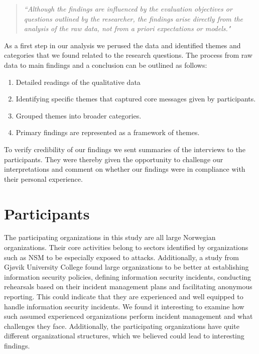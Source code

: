 \begin{quote}
\textit{``Although the findings are influenced by the evaluation objectives or
questions outlined by the researcher, the findings arise directly from the analysis of the raw data, not from a priori expectations or models."}
\end{quote}

As a first step in our analysis we perused the data and identified themes and categories that we found related to the research questions. The process from raw data to main findings and a conclusion can be outlined as follows:

\begin{enumerate}
\vspace{0,5cm}
\item Detailed readings of the qualitative data
\item Identifying specific themes that captured core messages given by participants.
\item Grouped themes into broader categories.
\item Primary findings are represented as a framework of themes.
\vspace{0,5cm}
\end{enumerate}

To verify credibility of our findings we sent summaries of the interviews to the participants. They were thereby given the opportunity to challenge our interpretations and comment on whether our findings were in compliance with their personal experience. 

\section{Participants}
The participating organizations in this study are all large Norwegian organizations. Their core activities belong to sectors identified by organizations such as \acs{NSM} to be especially exposed to attacks. Additionally, a study from Gj\o vik University College \cite{sand2010hendelseshaandtering} found large organizations to be better at establishing information security policies, defining information security incidents, conducting rehearsals based on their incident management plans and facilitating anonymous reporting. This could indicate that they are experienced and well equipped to handle information security incidents. We found it interesting to examine how such assumed experienced organizations perform incident management and what challenges they face. Additionally, the participating organizations have quite different organizational structures, which we believed could lead to interesting findings.

